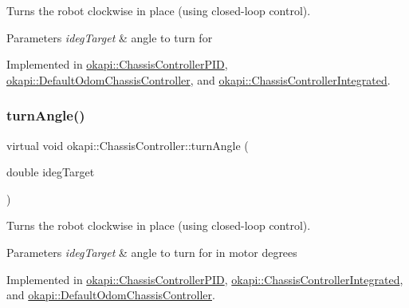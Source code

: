 Turns the robot clockwise in place (using closed-\/loop control).


\begin{DoxyParams}{Parameters}
{\em ideg\+Target} & angle to turn for \\
\hline
\end{DoxyParams}


Implemented in \mbox{\hyperlink{classokapi_1_1ChassisControllerPID_a56aae5a15daa9ed81963dd48fce69535}{okapi\+::\+Chassis\+Controller\+P\+ID}}, \mbox{\hyperlink{classokapi_1_1DefaultOdomChassisController_a4ba07ac4bea9ff2d8aea30be72f6a0ea}{okapi\+::\+Default\+Odom\+Chassis\+Controller}}, and \mbox{\hyperlink{classokapi_1_1ChassisControllerIntegrated_a3c2ae782167fd9c6b27d637563e3a066}{okapi\+::\+Chassis\+Controller\+Integrated}}.

\mbox{\label{classokapi_1_1ChassisController_a6aca227e35ececd02eed1cc42d09ad1d}} 
\subsubsection{\texorpdfstring{turnAngle()}{turnAngle()}\hspace{0.1cm}{\footnotesize\ttfamily [2/2]}}
{\footnotesize\ttfamily virtual void okapi\+::\+Chassis\+Controller\+::turn\+Angle (\begin{DoxyParamCaption}\item[{double}]{ideg\+Target }\end{DoxyParamCaption})\hspace{0.3cm}{\ttfamily [pure virtual]}}

Turns the robot clockwise in place (using closed-\/loop control).


\begin{DoxyParams}{Parameters}
{\em ideg\+Target} & angle to turn for in motor degrees \\
\hline
\end{DoxyParams}


Implemented in \mbox{\hyperlink{classokapi_1_1ChassisControllerPID_a140679da584fdc8bd057678e277742e7}{okapi\+::\+Chassis\+Controller\+P\+ID}}, \mbox{\hyperlink{classokapi_1_1ChassisControllerIntegrated_a3f13749508bf420468ffdb54f62a9da2}{okapi\+::\+Chassis\+Controller\+Integrated}}, and \mbox{\hyperlink{classokapi_1_1DefaultOdomChassisController_a05a8a6684b3afe4f7c2ecbc24699f70d}{okapi\+::\+Default\+Odom\+Chassis\+Controller}}.

